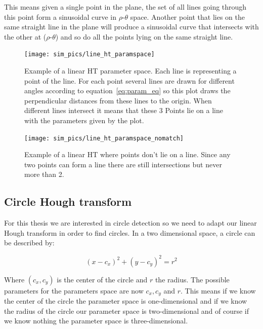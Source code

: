 \documentclass[11pt,twoside]{scrreprt}
\begin{document}
This means given a single point in the plane, the set of all lines going through this point form a sinusoidal curve in $\rho\text{-}\theta$ space. Another point 
that lies on the same straight line in the plane will produce a sinusoidal curve that intersects with the other at ($\rho\text{-}\theta$) and so do all the points lying on the same straight line. 


\begin{figure}[tb]
  \centering
  \texttt{[image: sim\_pics/line\_ht\_paramspace]}
  \caption[Example of a linear HT space]{Example of a linear HT parameter space. Each line is representing a point of the line. For each point several lines are drawn for different angles according to equation~\ref{eq:param_eq} so this plot draws the perpendicular distances from these lines to the origin. When different lines intersect it means that these 3 Points lie on a line with the parameters given by the plot.}
  \label{fig:line_ht}
\end{figure}

\begin{figure}[tb]
  \centering
  \texttt{[image: sim\_pics/line\_ht\_paramspace\_nomatch]}
  \caption[Example of a linear HT where points don't lie on a line]{Example of a linear HT where points don't lie on a line. Since any two points can form a line there are still intersections but never more than 2.}
  \label{fig:line_ht_nomatch}
\end{figure}

\subsection{Circle Hough transform} %
\label{sub:circle_hough_transform}

For this thesis we are interested in circle detection so we need to adapt our linear Hough transform in order to find circles. In a two dimensional space, a circle can be described by:

\begin{equation}
		(x-c_x)^2 + (y-c_y)^2 = r^2
\end{equation}

Where $(c_x,c_y)$ is the center of the circle and $r$ the radius. The possible parameters for the parameters space are now $c_x, c_y$ and $r$. This means if we know the center of the circle the parameter space is one-dimensional and if we know the radius of the circle our parameter space is two-dimensional and of course if we know nothing the parameter space is three-dimensional.
\end{document}
